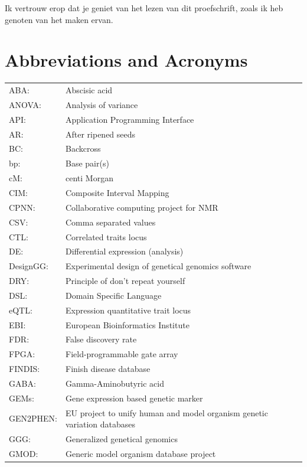 Ik vertrouw erop dat je geniet van het lezen van dit proefschrift, zoals ik heb genoten van het maken 
ervan.

\newpage
\section{Abbreviations and Acronyms}
{\footnotesize
\begin{tabular}{ l l }
ABA:         & Abscisic acid\\
ANOVA:       & Analysis of variance\\
API:         & Application Programming Interface\\
AR:          & After ripened seeds\\
BC:          & Backcross \\
bp:          & Base pair(s) \\
cM:          & centi Morgan \\
CIM:         & Composite Interval Mapping \\
CPNN:        & Collaborative computing project for NMR\\
CSV:         & Comma separated values\\
CTL:         & Correlated traits locus \\
DE:          & Differential expression (analysis)\\
DesignGG:    & Experimental design of genetical genomics software\\
DRY:         & Principle of don't repeat yourself\\
DSL:         & Domain Specific Language\\
eQTL:        & Expression quantitative trait locus\\
EBI:         & European Bioinformatics Institute\\
FDR:         & False discovery rate\\
FPGA:        & Field-programmable gate array\\
FINDIS:      & Finish disease database\\
GABA:        & Gamma-Aminobutyric acid\\
GEMs:        & Gene expression based genetic marker\\
GEN2PHEN:    & EU project to unify human and model organism genetic variation databases\\
GGG:         & Generalized genetical genomics\\
GMOD:        & Generic model organism database project\\

\end{tabular}}
